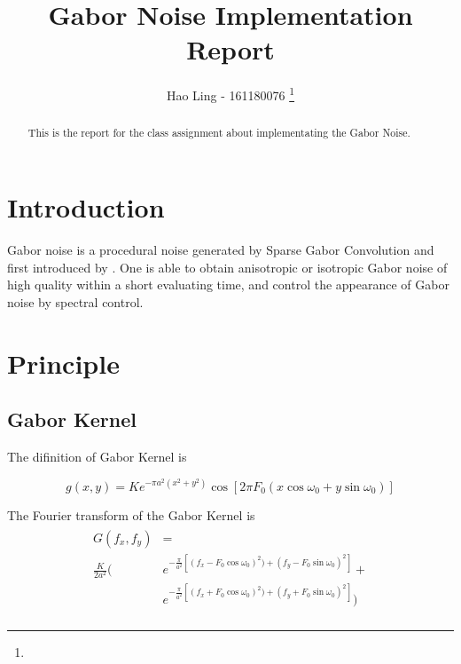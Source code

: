 \documentclass[journal, a4paper]{IEEEtran}
\begin{document}
	\title{Gabor Noise Implementation Report}
	\author{Hao Ling - 161180076
	\thanks{}}
	\maketitle

\begin{abstract}
  This is the report for the class assignment about implementating the Gabor Noise.
\end{abstract}

\section{Introduction}
  Gabor noise is a procedural noise generated by Sparse Gabor Convolution and first introduced by
  \cite{lagae2009procedural}. One is able to obtain anisotropic or isotropic Gabor noise of high quality
  within a short evaluating time, and control the appearance of Gabor noise by 
  spectral control. 

\section{Principle}
\subsection{Gabor Kernel}
  The difinition of Gabor Kernel is 

  $$
    g(x, y) = Ke^{-\pi a^2(x^2+y^2)}\cos [ 2\pi F_0 (x\cos \omega_0 + y \sin \omega_0 ) ]
  $$

  The Fourier transform of the Gabor Kernel is
  \begin{gather*}
  \begin{aligned}
    G(f_x, f_y) & = \\ 
    \frac{K}{2a^2} (
    & e^{-\frac{\pi}{a^2} [(f_x - F_0\cos \omega_0)^2) + (f_y - F_0 \sin \omega_0)^2]}+ \\
    & e^{-\frac{\pi}{a^2} [(f_x + F_0\cos \omega_0)^2) + (f_y + F_0 \sin \omega_0)^2]} ) \\
  \end{aligned} 
  \end{gather*}
\end{document}
